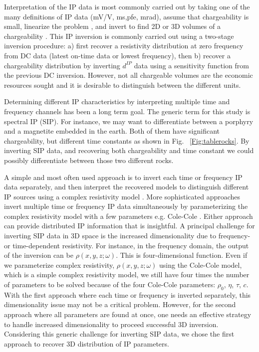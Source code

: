 \documentclass[letterpaper,11pt]{article}
\newcommand{\dip}{d^{IP}}
\begin{document}
Interpretation of the IP data is most commonly carried out by taking one of the many definitions of IP data (mV/V, ms,pfe, mrad), assume that chargeability is small, linearize  the problem \cite[]{seigel1959}, and invert to find 2D or 3D volumes of a chargeability \cite[]{doug1994}. 
This IP inversion is commonly carried out using a two-stage inversion procedure: a) first recover a resistivity distribution at zero frequency from DC data (latest on-time data or lowest frequency), then b) recover a chargeability distribution by inverting $\dip$ data using a sensitivity function from the previous DC inversion. However, not all chargeable volumes are the economic resources sought and it is desirable to distinguish between the different units. 

Determining different IP characteristics by interpreting multiple time and frequency channels has been a long term goal. The generic term for this study is spectral IP (SIP). For instance, we may want to differentiate between a porphyry and a magnetite embedded in the earth. Both of them have significant chargeability, but different time constants as shown in Fig. ~\ref{Fig:tablerocks}. By inverting SIP data, and recovering both chargeability and time constant we could possibly differentiate between those two different rocks. 

A simple and most often used approach is to invert each time or frequency IP data separately, and then interpret the recovered models to distinguish different IP sources using a complex resistivity model \cite[]{Yuval1997,Kemna2004,Hordt2006}. 
More sophisticated approaches invert multiple time or frequency IP data simultaneously by parameterizing the complex resistivity model with a few parameters e.g. Cole-Cole \cite[]{Kemna2004,Fiandaca2012}. Either approach can provide distributed IP information that is insightful. A principal challenge for inverting SIP data in 3D space is the increased dimensionality due to frequency- or time-dependent resistivity. For instance, in the frequency domain, the output of the inversion can be $\rho(x,y,z;\omega)$. This is four-dimensional function. Even if we parameterize complex resistivity, $\rho(x,y,z;\omega)$  using the Cole-Cole model, which is a simple complex resistivity model, we still have four times the number of parameters to be solved  because of the four Cole-Cole parameters: $\rho_0$, $\eta$, $\tau$, $c$. 
With the first approach where each time or frequency is inverted separately, this dimensionality issue may not be a critical problem. However, for the second approach where all parameters are found at once, one needs an effective strategy to handle increased dimensionality to proceed successful 3D inversion. Considering this generic challenge for inverting SIP data, we chose the first approach to recover 3D distribution of IP parameters. 
\end{document}
